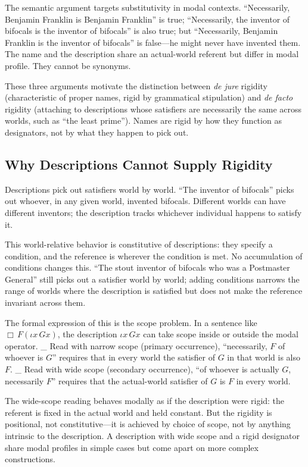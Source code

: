 \documentclass[12pt,a4paper]{article}
\begin{document}
The semantic argument targets substitutivity in modal contexts. ``Necessarily, Benjamin Franklin is Benjamin Franklin'' is true; ``Necessarily, the inventor of bifocals is the inventor of bifocals'' is also true; but ``Necessarily, Benjamin Franklin is the inventor of bifocals'' is false---he might never have invented them. The name and the description share an actual-world referent but differ in modal profile. They cannot be synonyms.

These three arguments motivate the distinction between \emph{de jure} rigidity (characteristic of proper names, rigid by grammatical stipulation) and \emph{de facto} rigidity (attaching to descriptions whose satisfiers are necessarily the same across worlds, such as ``the least prime''). Names are rigid by how they function as designators, not by what they happen to pick out.

\subsection{Why Descriptions Cannot Supply Rigidity}\label{why-descriptions-cannot-supply-rigidity}

Descriptions pick out satisfiers world by world. ``The inventor of bifocals'' picks out whoever, in any given world, invented bifocals. Different worlds can have different inventors; the description tracks whichever individual happens to satisfy it.

This world-relative behavior is constitutive of descriptions: they specify a condition, and the reference is wherever the condition is met. No accumulation of conditions changes this. ``The stout inventor of bifocals who was a Postmaster General'' still picks out a satisfier world by world; adding conditions narrows the range of worlds where the description is satisfied but does not make the reference invariant across them.

The formal expression of this is the scope problem. In a sentence like \(\Box \, F(\iota x\, G x)\), the description \(\iota x\, G x\) can take scope inside or outside the modal operator. \_ Read with narrow scope (primary occurrence), ``necessarily, \(F\) of whoever is \(G\)'' requires that in every world the satisfier of \(G\) in that world is also \(F\). \_ Read with wide scope (secondary occurrence), ``of whoever is actually \(G\), necessarily \(F\)'' requires that the actual-world satisfier of \(G\) is \(F\) in every world.

The wide-scope reading behaves modally as if the description were rigid: the referent is fixed in the actual world and held constant. But the rigidity is positional, not constitutive---it is achieved by choice of scope, not by anything intrinsic to the description. A description with wide scope and a rigid designator share modal profiles in simple cases but come apart on more complex constructions.
\end{document}
